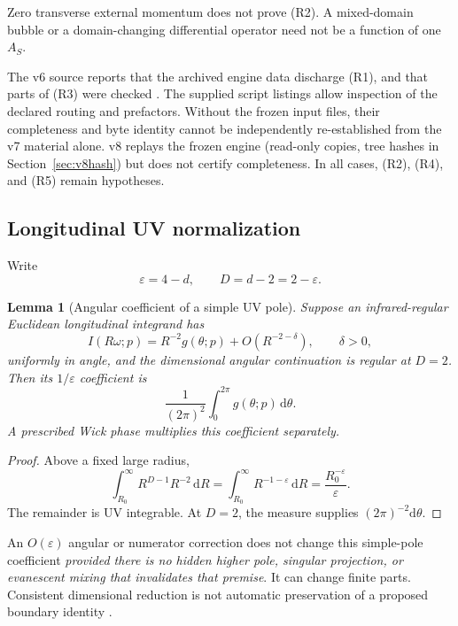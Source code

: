 \documentclass[11pt,a4paper]{article}
\newcommand{\dd}{\mathrm d}
\newcommand{\eps}{\varepsilon}
\theoremstyle{plain}
\newtheorem{lemma}[theorem]{Lemma}
\theoremstyle{definition}
\theoremstyle{remark}
\numberwithin{equation}{section}
\begin{document}
Zero transverse external momentum does not prove (R2).
A mixed-domain bubble or a domain-changing differential operator
need not be a function of one \(A_S\).

The v6 source reports that the archived engine data discharge
(R1), and that parts of (R3) were checked
\cite{CheungConeV6}. The supplied script listings allow inspection
of the declared routing and prefactors. Without the frozen input
files, their completeness and byte identity cannot be
independently re-established from the v7 material alone.
v8 replays the frozen engine (read-only copies, tree hashes in
Section~\ref{sec:v8hash}) but does not certify completeness.
In all cases, (R2), (R4), and (R5) remain hypotheses.

\subsection{Longitudinal UV normalization}

Write
\[
 \eps=4-d,\qquad D=d-2=2-\eps.
\]

\begin{lemma}[Angular coefficient of a simple UV pole]
\label{lem:UV}
Suppose an infrared-regular Euclidean longitudinal integrand has
\[
 I(R\omega;p)=R^{-2}g(\theta;p)+O(R^{-2-\delta}),
 \qquad \delta>0,
\]
uniformly in angle, and the dimensional angular continuation is
regular at \(D=2\).
Then its \(1/\eps\) coefficient is
\begin{equation}
 \frac1{(2\pi)^2}\int_0^{2\pi}g(\theta;p)\,\dd\theta.
 \label{eq:UV}
\end{equation}
A prescribed Wick phase multiplies this coefficient separately.
\end{lemma}

\begin{proof}
Above a fixed large radius,
\[
 \int_{R_0}^\infty R^{D-1}R^{-2}\,\dd R
 =\int_{R_0}^\infty R^{-1-\eps}\,\dd R
 =\frac{R_0^{-\eps}}{\eps}.
\]
The remainder is UV integrable. At \(D=2\), the measure supplies
\((2\pi)^{-2}\dd\theta\).
\end{proof}

An \(O(\eps)\) angular or numerator correction does not change
this simple-pole coefficient \emph{provided there is no hidden
higher pole, singular projection, or evanescent mixing that
invalidates that premise}. It can change finite parts.
Consistent dimensional reduction is not automatic preservation
of a proposed boundary identity \cite{Stockinger}.

\end{document}
